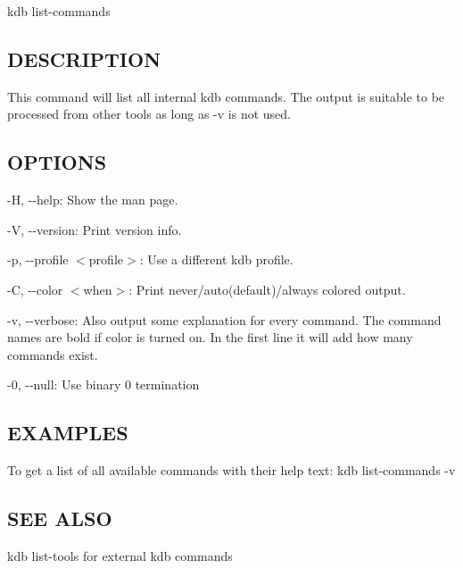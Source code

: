 {\ttfamily kdb list-\/commands}

\subsection*{D\+E\+S\+C\+R\+I\+P\+T\+I\+ON}

This command will list all internal kdb commands. The output is suitable to be processed from other tools as long as {\ttfamily -\/v} is not used.

\subsection*{O\+P\+T\+I\+O\+NS}


\begin{DoxyItemize}
\item {\ttfamily -\/H}, {\ttfamily -\/-\/help}\+: Show the man page.
\item {\ttfamily -\/V}, {\ttfamily -\/-\/version}\+: Print version info.
\item {\ttfamily -\/p}, {\ttfamily -\/-\/profile $<$profile$>$}\+: Use a different kdb profile.
\item {\ttfamily -\/C}, {\ttfamily -\/-\/color $<$when$>$}\+: Print never/auto(default)/always colored output.
\item {\ttfamily -\/v}, {\ttfamily -\/-\/verbose}\+: Also output some explanation for every command. The command names are bold if color is turned on. In the first line it will add how many commands exist.
\item {\ttfamily -\/0}, {\ttfamily -\/-\/null}\+: Use binary 0 termination
\end{DoxyItemize}

\subsection*{E\+X\+A\+M\+P\+L\+ES}

To get a list of all available commands with their help text\+: {\ttfamily kdb list-\/commands -\/v}

\subsection*{S\+EE A\+L\+SO}


\begin{DoxyItemize}
\item {\ttfamily kdb list-\/tools} for external kdb commands 
\end{DoxyItemize}